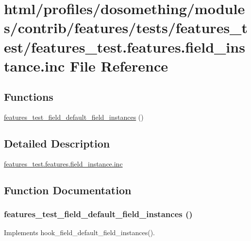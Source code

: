 \hypertarget{features__test_8features_8field__instance_8inc}{
\section{html/profiles/dosomething/modules/contrib/features/tests/features\_\-test/features\_\-test.features.field\_\-instance.inc File Reference}
\label{features__test_8features_8field__instance_8inc}
}
\subsection*{Functions}
\begin{DoxyCompactItemize}
\item 
\hyperlink{features__test_8features_8field__instance_8inc_adcbfc45ef7a921773fcd2a90a479e659}{features\_\-test\_\-field\_\-default\_\-field\_\-instances} ()
\end{DoxyCompactItemize}


\subsection{Detailed Description}
\hyperlink{features__test_8features_8field__instance_8inc}{features\_\-test.features.field\_\-instance.inc} 

\subsection{Function Documentation}
\hypertarget{features__test_8features_8field__instance_8inc_adcbfc45ef7a921773fcd2a90a479e659}{
\subsubsection[{features\_\-test\_\-field\_\-default\_\-field\_\-instances}]{\setlength{\rightskip}{0pt plus 5cm}features\_\-test\_\-field\_\-default\_\-field\_\-instances ()}}
\label{features__test_8features_8field__instance_8inc_adcbfc45ef7a921773fcd2a90a479e659}
Implements hook\_\-field\_\-default\_\-field\_\-instances(). 